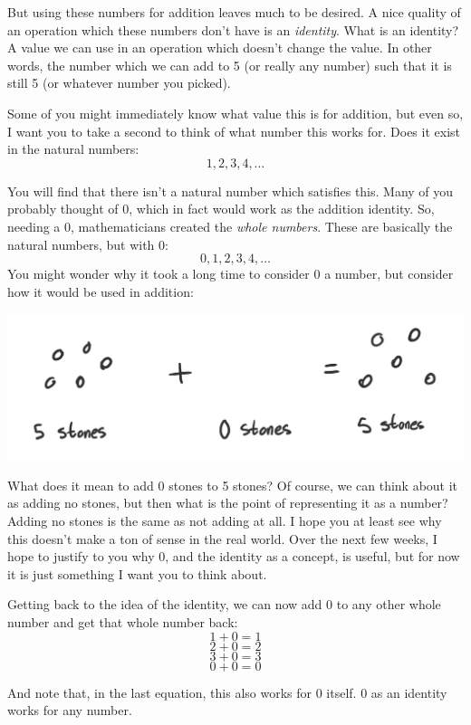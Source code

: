 \documentclass{article}
\begin{document}
But using these numbers for addition leaves much to be desired. A nice quality of an operation which these numbers don't have is an \textit{identity}. What is an identity? A value we can use in an operation which doesn't change the value. In other words, the number which we can add to 5 (or really any number) such that it is still 5 (or whatever number you picked). 

Some of you might immediately know what value this is for addition, but even so, I want you to take a second to think of what number this works for. Does it exist in the natural numbers: 
\[ 1, 2, 3, 4, \ldots \]

You will find that there isn't a natural number which satisfies this. Many of you probably thought of 0, which in fact would work as the addition identity. So, needing a 0, mathematicians created the \textit{whole numbers}. These are basically the natural numbers, but with 0: 
\[ 0, 1, 2, 3, 4, \ldots \]
\newpage
You might wonder why it took a long time to consider 0 a number, but consider how it would be used in addition: 
\begin{center}
    \includegraphics[scale=0.5]{chap1images/chapter1_draw2.png}
\end{center}

What does it mean to add 0 stones to 5 stones? Of course, we can think about it as adding no stones, but then what is the point of representing it as a number? Adding no stones is the same as not adding at all. I hope you at least see why this doesn't make a ton of sense in the real world. Over the next few weeks, I hope to justify to you why 0, and the identity as a concept, is useful, but for now it is just something I want you to think about. 

Getting back to the idea of the identity, we can now add 0 to any other whole number and get that whole number back: 
\[ 1 + 0 = 1 \]
\[ 2 + 0 = 2 \]
\[ 3 + 0 = 3 \]
\[ 0 + 0 = 0 \]

And note that, in the last equation, this also works for 0 itself. 0 as an identity works for any number. 
\end{document}
